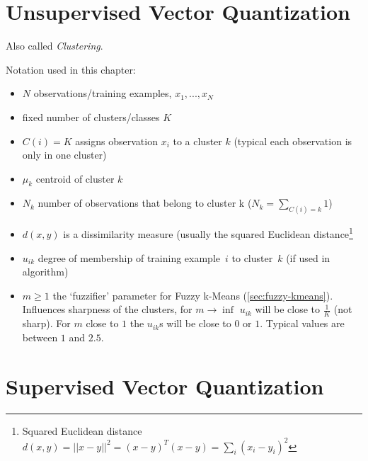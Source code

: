 \chapter{Unsupervised Vector Quantization}\label{chapter:clustering}
Also called \emph{Clustering}.

Notation used in this chapter:
\begin{itemize}
\item $N$ observations/training examples, $x_1, ..., x_N$
\item fixed number of clusters/classes $K$
\item $C(i) = K$ assigns observation $x_i$ to a cluster $k$ (typical each observation is only in one cluster)
\item $\mu_k$ centroid of cluster $k$
\item $N_k$ number of observations that belong to cluster k ($N_k = \sum\limits_{C(i)=k} 1$)
\item $d(x, y)$ is a dissimilarity measure (usually the squared Euclidean distance\footnote{Squared Euclidean distance $d(x, y) = ||x-y||^2 = (x-y)^T (x-y) = \sum_i (x_i-y_i)^2$}
\item $u_{ik}$ degree of membership of training example~$i$ to cluster~$k$ (if used in algorithm)
\item $m \geq 1$ the `fuzzifier' parameter for Fuzzy k-Means (\ref{sec:fuzzy-kmeans}). Influences sharpness of the clusters, for $m \to \inf$ $u_{ik}$ will be close to $\frac{1}{K}$ (not sharp). For $m$ close to $1$ the $u_{ik}$s will be close to $0$ or $1$. Typical values are between $1$ and $2.5$.
\end{itemize}







\chapter{Supervised Vector Quantization}\label{chapter:lvq}




